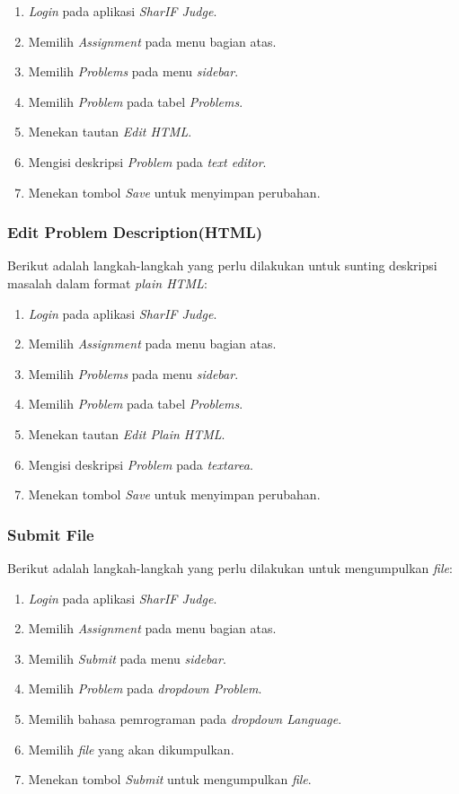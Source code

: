 \begin{enumerate}
	\item \textit{Login} pada aplikasi \textit{SharIF Judge}.
	\item Memilih \textit{Assignment} pada menu bagian atas.
	\item Memilih \textit{Problems} pada menu \textit{sidebar}.
	\item Memilih \textit{Problem} pada tabel \textit{Problems}.
	\item Menekan tautan \textit{Edit HTML}.
	\item Mengisi deskripsi \textit{Problem} pada \textit{text editor}.
	\item Menekan tombol \textit{Save} untuk menyimpan perubahan.
\end{enumerate}

\subsubsection{Edit Problem Description(HTML)}
\label{subsubsec:skenario_edit_problem_description_plain_html}
Berikut adalah langkah-langkah yang perlu dilakukan untuk sunting deskripsi masalah dalam format \textit{plain HTML}:

\begin{enumerate}
	\item \textit{Login} pada aplikasi \textit{SharIF Judge}.
	\item Memilih \textit{Assignment} pada menu bagian atas.
	\item Memilih \textit{Problems} pada menu \textit{sidebar}.
	\item Memilih \textit{Problem} pada tabel \textit{Problems}.
	\item Menekan tautan \textit{Edit Plain HTML}.
	\item Mengisi deskripsi \textit{Problem} pada \textit{textarea}.
	\item Menekan tombol \textit{Save} untuk menyimpan perubahan.
\end{enumerate}

\subsubsection{Submit File}
\label{subsubsec:skenario_submit}
Berikut adalah langkah-langkah yang perlu dilakukan untuk mengumpulkan \textit{file}:

\begin{enumerate}
	\item \textit{Login} pada aplikasi \textit{SharIF Judge}.
	\item Memilih \textit{Assignment} pada menu bagian atas.
	\item Memilih \textit{Submit} pada menu \textit{sidebar}.
	\item Memilih \textit{Problem} pada \textit{dropdown Problem}.
	\item Memilih bahasa pemrograman pada \textit{dropdown Language}.
	\item Memilih \textit{file} yang akan dikumpulkan.
	\item Menekan tombol \textit{Submit} untuk mengumpulkan \textit{file}.
\end{enumerate}

